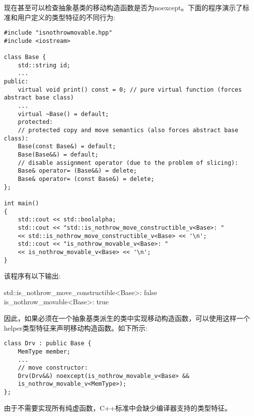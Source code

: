 现在甚至可以检查抽象基类的移动构造函数是否为noexcept。下面的程序演示了标准和用户定义的类型特征的不同行为:\par

{\color{red}{poly/isnothrowmovable.cpp}}\par

\begin{lstlisting}[caption={}]
#include "isnothrowmovable.hpp"
#include <iostream>

class Base {
	std::string id;
	...
public:
	virtual void print() const = 0; // pure virtual function (forces abstract base class)
	...
	virtual ~Base() = default;
	protected:
	// protected copy and move semantics (also forces abstract base class):
	Base(const Base&) = default;
	Base(Base&&) = default;
	// disable assignment operator (due to the problem of slicing):
	Base& operator= (Base&&) = delete;
	Base& operator= (const Base&) = delete;
};

int main()
{
	std::cout << std::boolalpha;
	std::cout << "std::is_nothrow_move_constructible_v<Base>: "
	<< std::is_nothrow_move_constructible_v<Base> << '\n';
	std::cout << "is_nothrow_movable_v<Base>: "
	<< is_nothrow_movable_v<Base> << '\n';
}
\end{lstlisting}

该程序有以下输出:\par

\begin{tcolorbox}[colback=white,colframe=black]
std::is\_nothrow\_move\_constructible<Base>: false \\
is\_nothrow\_movable<Base>: true
\end{tcolorbox}

因此，如果必须在一个抽象基类派生的类中实现移动构造函数，可以使用这样一个helper类型特征来声明移动构造函数。如下所示:\par

\begin{lstlisting}[caption={}]
class Drv : public Base {
	MemType member;
	...
	// move constructor:
	Drv(Drv&&) noexcept(is_nothrow_movable_v<Base> &&
	is_nothrow_movable_v<MemType>);
};
\end{lstlisting}

由于不需要实现所有纯虚函数，C++标准中会缺少编译器支持的类型特征。\par



























